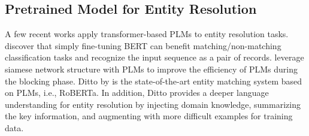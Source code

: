 
\subsection{Pretrained Model for Entity Resolution}


A few recent works apply transformer-based PLMs to entity resolution tasks. \citet{paganelli_analyzing_2022} discover that simply fine-tuning BERT can benefit matching/non-matching classification tasks and recognize the input sequence as a pair of records. \citet{li_improving_2021} leverage siamese network structure with PLMs to improve the efficiency of PLMs during the blocking phase. 
Ditto by \cite{li_deep_2020} is the state-of-the-art entity matching system based on PLMs, i.e., RoBERTa. In addition, Ditto provides a deeper language understanding for entity resolution by injecting domain knowledge, summarizing the key information, and augmenting with more difficult examples for training data. 
 
\vspace{-0.5em}
